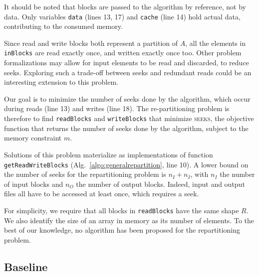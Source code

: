 \documentclass[sigconf, nonacm]{acmart}
\newcommand{\tristan}[1]{\color{orange}\textbf{From Tristan:}#1\color{black}}
\begin{document}
It should be noted that blocks are passed to the algorithm by reference,
not by data. Only variables \texttt{data} (lines 13, 17) and \texttt{cache}
(line 14) hold actual data, contributing to the consumed memory.

Since read and write blocks both represent a partition of $A$, all the
elements in \texttt{inBlocks} are read exactly once, and written exactly once too. Other
problem formalizations may allow for input elements to be read and
discarded, to reduce seeks. Exploring such a trade-off
between seeks and redundant reads could be an interesting extension to this problem.

Our goal is to minimize the number of seeks done by the algorithm, which
occur during reads (line 13) and writes (line 18). The re-partitioning
problem is therefore to find \texttt{readBlocks} and \texttt{writeBlocks} that
minimize \textsc{seeks}, the objective function that returns the number of
seeks done by the algorithm, subject to the memory constraint $m$.


Solutions of this problem materialize as implementations of function
\texttt{getReadWriteBlocks} (Alg.~\ref{algo:generalrepartition}, line 10). A
lower bound on the number of seeks for the repartitioning problem is $n_I +
n_I$, with $n_I$ the number of input blocks and $n_O$ the number of output
blocks. Indeed, input and output files all have to be accessed at least
once, which requires a seek.

For simplicity, we require that all blocks in \texttt{readBlocks} have the
same shape $R$. We also identify the size of an array in memory as its
number of elements. To the best of our knowledge, no algorithm has been
proposed for the repartitioning problem.


\subsection{Baseline}
\end{document}
